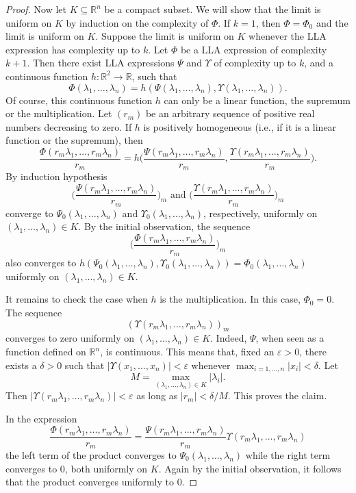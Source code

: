 \documentclass{memo-l}
\theoremstyle{definition}
\theoremstyle{remark}
\numberwithin{section}{chapter}
\numberwithin{equation}{chapter}
\newcommand\R{\ensuremath{\mathbb{R}}}
\begin{document}
\begin{proof}
    Now let $K\subseteq \R^{n}$ be a compact subset. We will show that
    the limit is uniform on $K$ by induction on the complexity of $\Phi $. If
    $k=1$, then $\Phi =\Phi _0$ and the limit is uniform on $K$. Suppose the
    limit is uniform on $K$ whenever the LLA expression has complexity up to $k$.
    Let $\Phi $ be a LLA expression of complexity $k+1$. Then there
    exist LLA expressions $\Psi $ and $\Upsilon $ of complexity up to $k$, and
    a continuous function $h\colon \R^2\to \R$, such that
    \[
    \Phi (\lambda _1,\ldots ,\lambda _n)=h(\Psi (\lambda _1,\ldots
    ,\lambda _n), \Upsilon (\lambda _1,\ldots ,\lambda _n)).
    \]
    Of course, this continuous function $h$ can only be a linear function,
    the supremum or the multiplication. Let $(r_m)$ be an arbitrary
    sequence of positive real numbers decreasing to zero. If $h$ is
    positively homogeneous (i.e., if it is a linear function or the
    supremum), then
    \[
        \frac{\Phi (r_m\lambda _1,\ldots ,r_m\lambda
        _n)}{r_m}=h\bigg(\frac{\Psi (r_m\lambda _1,\ldots
        ,r_m\lambda _n)}{r_m}, \frac{\Upsilon (r_m\lambda _1,\ldots
        ,r_m\lambda _n)}{r_m}\bigg).
    \]
    By induction hypothesis
    \[
    \bigg(\frac{\Psi (r_m\lambda _1,\ldots
        ,r_m\lambda _n)}{r_m}\bigg)_m\text{ and } \bigg(\frac{\Upsilon (r_m\lambda _1,\ldots
        ,r_m\lambda _n)}{r_m}\bigg)_m
    \]
    converge to $\Psi _0(\lambda _1,\ldots ,\lambda _n)$ and
    $\Upsilon_0(\lambda _1,\ldots ,\lambda _n)$, respectively, uniformly
    on $(\lambda _1,\ldots ,\lambda _n) \in K$. By the initial
    observation, the sequence
    \[
         \bigg(\frac{\Phi (r_m\lambda _1,\ldots ,r_m\lambda
        _n)}{r_m}\bigg)_m
    \]
    also converges to $h(\Psi _0(\lambda _1,\ldots ,\lambda _n),
    \Upsilon_0(\lambda _1,\ldots ,\lambda _n))=\Phi _0(\lambda_1,\ldots
    ,\lambda _n)$ uniformly on $(\lambda
    _1,\ldots ,\lambda _n) \in K$.

    It remains to check the case when $h$ is the multiplication. In
    this case, $\Phi _0=0$. The sequence
    \[
        (\Upsilon (r_m\lambda _1,\ldots ,r_m\lambda _n))_m
    \]
    converges to zero uniformly on $(\lambda _1,\ldots ,\lambda _n) \in
    K$. Indeed, $\Psi $, when seen as a function defined on $\R^{n}$, is
    continuous. This means that, fixed an $\varepsilon >0$, there exists
    a $\delta >0$ such that $|\Upsilon (x_1,\ldots ,x_n)|<\varepsilon $
    whenever $\max_{i=1,\ldots ,n}|x_i|<\delta $. Let
    \[
    M=\max_{(\lambda _1,\ldots ,\lambda _n)\in K} |\lambda _i|.
    \]
    Then $|\Upsilon (r_m\lambda _1,\ldots ,r_m\lambda _n)|<\varepsilon $
    as long as $|r_m|<\delta /M$. This proves the claim.

    In the expression
    \[
    \frac{\Phi (r_m\lambda _1,\ldots ,r_m\lambda
    _n)}{r_m}=\frac{\Psi (r_m\lambda _1,\ldots ,r_m\lambda
        _n)}{r_m}\Upsilon (r_m\lambda _1,\ldots ,r_m\lambda _n)
    \]
    the left term of the product converges to $\Psi_0(\lambda _1,\ldots
    ,\lambda _n)$ while the right term converges to $0$, both uniformly on
    $K$. Again by the initial observation, it follows that the product
    converges uniformly to $0$.
\end{proof}
\end{document}
